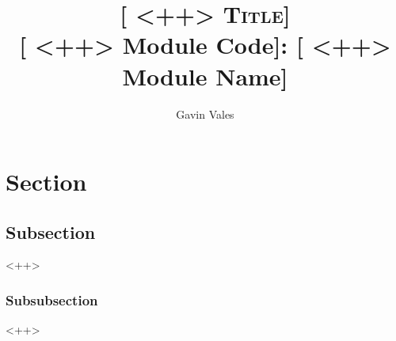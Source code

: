 \documentclass[11pt]{article}
\title{
\textsc{[ <++> Title]}\\
{\large [ <++> Module Code]: [ <++> Module Name]}
}
\author{Gavin Vales}
\date{}
\begin{document}
\maketitle

\tableofcontents

\section{Section}

\subsection{Subsection}
<++>

\subsubsection{Subsubsection}
<++>

\cite{jenkins2003}

\printbibliography
\end{document}
